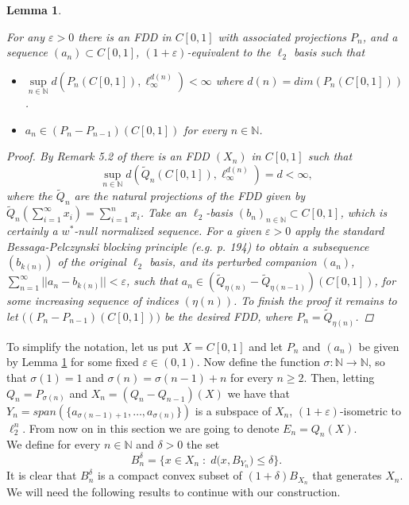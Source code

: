 \documentclass[11pt]{amsart}
\newcommand{\ep}{\varepsilon}
\newcommand{\N}{\mathbb{N}}
\newcommand{\<}{\langle}
\renewcommand{\>}{\rangle}
\newtheorem{lemma}[theorem]{Lemma}
\theoremstyle{definition}
\theoremstyle{remark}
\numberwithin{equation}{section}
\begin{document}
\begin{lemma}\label{fddjohnson}

For any $\ep>0$ there is an FDD in $C[0,1]$ with associated projections $P_n$, and a sequence $(a_n)\subset C[0,1]$, $(1+\ep)$-equivalent to the $\ell_2$
basis such that
\begin{itemize}
\item $\sup\limits_{n\in \N}d(P_n(C[0,1]),\ell_\infty^{d(n)})<\infty$ where $d(n)=dim(P_n(C[0,1]))$.
\item $a_n\in (P_n-P_{n-1})(C[0,1])$ for every $n\in\N$.
\end{itemize}
\begin{proof}
By Remark 5.2 of \cite{Joh2} there is an FDD $(X_n)$ in $C[0,1]$ such that 
\begin{equation}\label{dd}
\sup\limits_{n\in\N}d(\tilde Q_n(C[0,1]),\ell_\infty^{d(n)})=d<\infty,
\end{equation}
where the $\tilde Q_n$ are the natural projections of the FDD given by $\tilde Q_n(\sum_{i=1}^\infty x_i)=\sum_{i=1}^n x_i$.
Take an $\ell_2$-basis $(b_n)_{n\in\N}\subset C[0,1]$, which is certainly a $w^*$-null normalized sequence. For a given $\ep>0$ apply the standard 
Bessaga-Pelczynski blocking principle (e.g. \cite{Fab1} p. 194) to obtain a subsequence $(b_{k(n)})$ of the original $\ell_2$ basis,
and its perturbed companion $(a_n)$, $\sum_{n=1}^\infty||a_n-b_{k(n)}||<\ep$, such that $a_n\in(\tilde Q_{\eta(n)}-\tilde Q_{\eta(n-1)})(C[0,1])$,
for some increasing sequence of indices $(\eta(n))$. To finish the proof it remains to let $\big((P_n-P_{n-1})(C[0,1])\big)$
be the desired FDD, where $P_n=\tilde Q_{\eta(n)}$.
\end{proof}
\end{lemma}
To simplify the notation, let us put $X=C[0,1]$ and let $P_n$ and $(a_n)$ be given by Lemma \ref{fddjohnson} for some fixed $\ep\in(0,1)$. Now define the function $\sigma:\N\rightarrow\N$, so that $\sigma(1)=1$ and $\sigma(n)=\sigma(n-1)+n$ for every $n\ge2$. Then, letting $Q_n=P_{\sigma(n)}$ and $X_n=(Q_n-Q_{n-1})(X)$ we have that $Y_n=span(\{a_{\sigma(n-1)+1},\dots,a_{\sigma(n)}\})$ is a subspace of $X_n$, $(1+\ep)$-isometric to $\ell_2^n$. From now on  in this section we are going to denote $E_n=Q_n(X).$\\

We define for every $n\in\N$ and $\delta>0$ the set 
$$B_n^\delta=\Big\{x\in X_n\;:\;d\big(x,B_{Y_n}\big)\le\delta\Big\}.$$
It is clear that $B_n^\delta$ is a compact convex subset of $(1+\delta)B_{X_n}$ that generates $X_n$. We will need the following  results to continue with our construction.
\end{document}
